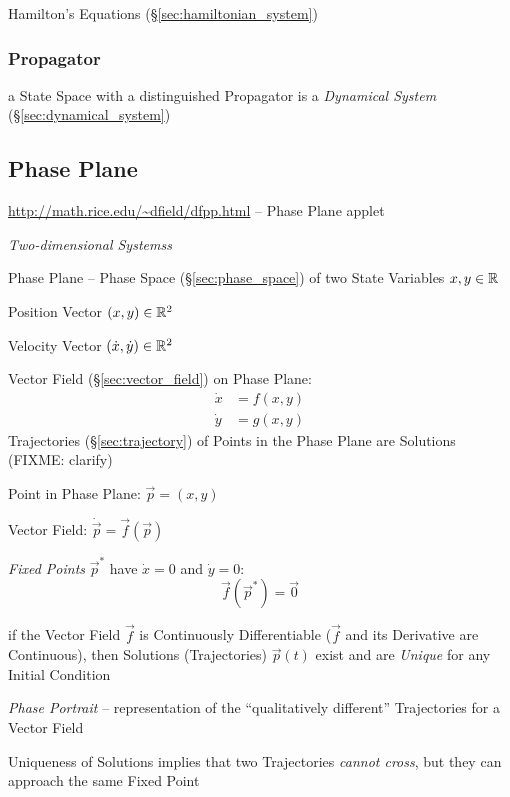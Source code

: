 Hamilton's Equations (\S\ref{sec:hamiltonian_system})



\subsubsection{Propagator}\label{sec:propagator}

a State Space with a distinguished Propagator is a \emph{Dynamical System}
(\S\ref{sec:dynamical_system})



\subsection{Phase Plane}\label{sec:phase_plane}

\url{http://math.rice.edu/~dfield/dfpp.html} -- Phase Plane applet

\emph{Two-dimensional Systemss}

Phase Plane -- Phase Space (\S\ref{sec:phase_space}) of two State Variables
$x,y \in \mathbb{R}$

Position Vector $(x,y) \in \mathbb{R}^2$

Velocity Vector $(\dot{x},\dot{y}) \in \mathbb{R}^2$

Vector Field (\S\ref{sec:vector_field}) on Phase Plane:
\begin{align*}
  \dot{x} & = f(x,y) \\
  \dot{y} & = g(x,y)
\end{align*}
Trajectories (\S\ref{sec:trajectory}) of Points in the Phase Plane are
Solutions (FIXME: clarify)

Point in Phase Plane: $\vec{p} = (x,y)$

Vector Field: $\dot{\vec{p}} = \vec{f}(\vec{p})$

\emph{Fixed Points} $\vec{p}^*$ have $\dot{x} = 0$ and $\dot{y} = 0$:
\[
  \vec{f}(\vec{p}^*) = \vec{0}
\]

if the Vector Field $\vec{f}$ is Continuously Differentiable ($\vec{f}$ and its
Derivative are Continuous), then Solutions (Trajectories) $\vec{p}(t)$ exist
and are \emph{Unique} for any Initial Condition

\emph{Phase Portrait} -- representation of the ``qualitatively different''
Trajectories for a Vector Field

Uniqueness of Solutions implies that two Trajectories \emph{cannot cross}, but
they can approach the same Fixed Point

